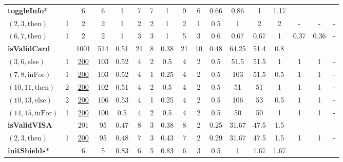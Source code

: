 \documentclass[sigconf]{acmart}
\newcommand{\thenBr}{\text{then}}
\newcommand{\elseBr}{\text{else}}
\newcommand{\inFor}{\text{inFor}}
\newcommand{\un}[1]{\underline{#1}}
\begin{document}
\begin{table}[!t]
\begin{tabular}{lc|ccc|ccc|ccc|ccc|ccc}
    \toprule
\multicolumn{2}{l|}{\textbf{toggleInfo}*}     
                                 & 6        & 6    & 1         & 7  & 7 & 1                 & 9 & 6   & 0.66               & 0.86  & 1     & 1.17  &    &      &       \\
    $(2,3,\thenBr)$   & 1        & 2        & 2    & 1         & 2  & 2 & 1                 & 2 & 1   & 0.5                & 1     & 2     & 2     & - & - & -  \\
    $(6,7,\thenBr)$   & 1        & 2        & 2    & 1         & 3  & 3 & 1                 & 5 & 3   & 0.6                & 0.67  & 0.67  & 1     & 0.37 & 0.36 & -  \\
    \toprule
\multicolumn{2}{l|}{\textbf{isValidCard}}        
                                 & 1001     & 514  & 0.51      & 21 & 8 & 0.38              & 21 & 10 & 0.48               & 64.25 & 51.4  & 0.8    &   &   &       \\
    $(3,6,\elseBr)$   & 1        & \un{200} & 103  & 0.52      & 4  & 2 & 0.5               & 4  & 2  & 0.5                & 51.5  & 51.5  & 1      & 1 & 1 & -   \\
    $(7,8,\inFor)$    & 1        & \un{200} & 103  & 0.52      & 4  & 1 & 0.25              & 4  & 2  & 0.5                & 103   & 51.5  & 0.5    & 1 & 1 & -  \\
    $(10,11,\thenBr)$ & 2        & \un{200} & 102  & 0.51      & 4  & 2 & 0.5               & 4  & 2  & 0.5                & 51    & 51    & 1      & 1 & 1 & -  \\
    $(10,13,\elseBr)$ & 2        & \un{200} & 106  & 0.53      & 4  & 1 & 0.25              & 4  & 2  & 0.5                & 106   & 53    & 0.5    & 1 & 1 & -  \\
    $(14,15,\inFor)$  & 1        & \un{200} & 100  & 0.5       & 4  & 2 & 0.5               & 4  & 2  & 0.5                & 50    & 50    & 1      & 1 & 1 & -  \\
    \hline
\multicolumn{2}{l|}{\textbf{isValidVISA}}        
                                 & 201      & 95   & 0.47      & 8  & 3 & 0.38              & 8  & 2  & 0.25               & 31.67 & 47.5  & 1.5    &   &   &       \\
    $(2,3,\thenBr)$   & 1        & \un{200} & 95   & 0.48      & 7  & 3 & 0.43              & 7  & 2  & 0.29               & 31.67 & 47.5  & 1.5    & 1 & 1 & -  \\
    \toprule
\multicolumn{2}{l|}{\textbf{initShields}*}    
                                 & 6        & 5    & 0.83      & 6  & 5 & 0.83              & 6  & 3  & 0.5                & 1      & 1.67 & 1.67   &      &      &       \\

\end{tabular}
\end{table}
\end{document}
